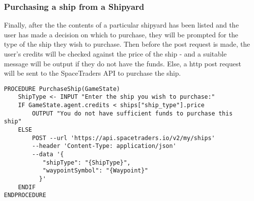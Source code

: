 \subsubsection{Purchasing a ship from a Shipyard}
Finally, after the the contents of a particular shipyard has been listed and the user has made a decision on which to purchase, they will be prompted for the type of the ship they wish to purchase. Then before the post request is made, the user's credits will be checked against the price of the ship - and a suitable message will be output if they do not have the funds. Else, a http post request will be sent to the SpaceTraders API to purchase the ship. 
\begin{lstlisting}
PROCEDURE PurchaseShip(GameState)
    ShipType <- INPUT "Enter the ship you wish to purchase:"
    IF GameState.agent.credits < ships["ship_type"].price
        OUTPUT "You do not have sufficient funds to purchase this ship"
    ELSE 
        POST --url 'https://api.spacetraders.io/v2/my/ships'
        --header 'Content-Type: application/json'
        --data '{
           "shipType": "{ShipType}",
           "waypointSymbol": "{Waypoint}"
          }'
    ENDIF
ENDPROCEDURE
\end{lstlisting}